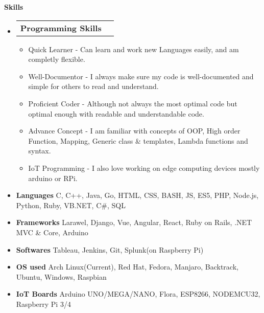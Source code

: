 \documentclass[letterpaper,12pt]{article}[leftmargin=*]
\makeatletter
\def \entryspacing {-0pt}
\renewcommand{\section}[2]{\vspace{5pt}
  \colorbox{secondary}{\color{white}\raggedbottom\normalsize\textbf{{#1}{\hspace{7pt}#2}}}
}
\newcommand{\resumeEntryStart}{\begin{itemize}[leftmargin=2.5mm]}
\newcommand{\resumeEntryEnd}{\end{itemize}\vspace{\entryspacing}}
\newcommand{\resumeItemListStart}{\begin{itemize}[leftmargin=4.5mm]}
\newcommand{\resumeItemListEnd}{\end{itemize}}
\newcommand{\resumeItem}[1]{
  \item\small{
    {#1 \vspace{-2pt}}
  }
}
\newcommand{\resumeEntryTD}[2]{
  \vspace{-1pt}\item[]
    \begin{tabularx}{0.97\textwidth}{X@{\hspace{60pt}}r}
      \textbf{\color{primary}#1} & {\firabook\color{accent}\small#2} \\
    \end{tabularx}\vspace{-6pt}
}
\newcommand{\resumeEntryS}[2]{
  \item[]\small{
    \textbf{\color{primary}#1 }{ #2 \vspace{-6pt}}
  }
}
\makeatother
\begin{document}
\section{\faGears}{Skills}
      \resumeEntryStart
        \resumeEntryTD
          {Programming Skills}{}
        \resumeItemListStart
          \resumeItem {Quick Learner - Can learn and work new Languages easily, and am completly flexible.}
          \resumeItem {Well-Documentor - I always make sure my code is well-documented and simple for others \linebreak to read and understand.}
          \resumeItem {Proficient Coder - Although not always the most optimal code but optimal enough with \linebreak readable and understandable code.}
          \resumeItem {Advance Concept - I am familiar with concepts of OOP, High order Function, Mapping,\linebreak
           Generic class \& templates, Lambda functions and syntax.}
          \resumeItem {IoT Programming - I also love working on edge computing devices mostly arduino or RPi.}
          \resumeItemListEnd
        \resumeEntryS{Languages} { C, C++, Java, Go, HTML, CSS, BASH, JS, ES5, PHP, Node.js, Python, Ruby, VB.NET, C\#, SQL}
        \resumeEntryS{Frameworks} {Larawel, Django, Vue, Angular, React, Ruby on Rails, .NET MVC \& Core, Arduino}
        \resumeEntryS{Softwares} {Tableau, Jenkins, Git, Splunk(on Raspberry Pi)}
        \resumeEntryS{OS used} {Arch Linux(Current), Red Hat, Fedora, Manjaro, Backtrack, Ubuntu, Windows, Raspbian}
        \resumeEntryS{IoT Boards} {Arduino UNO/MEGA/NANO, Flora, ESP8266, NODEMCU32, Raspberry Pi 3/4}
      
      \begin{flushright}
      \end{flushright}
  \resumeEntryEnd    
  
\end{document}
